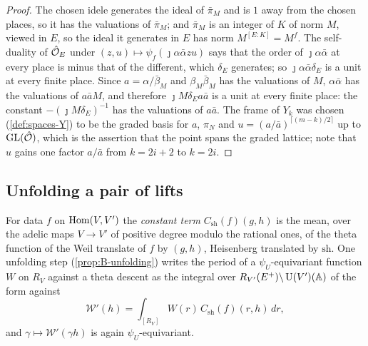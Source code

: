\begin{proof}
The chosen idele generates the ideal of $\bar\pi_M$ and is $1$ away from the chosen places, so it has the valuations of $\bar\pi_M$; and $\bar\pi_M$ is an integer of $K$ of norm $M$, viewed in $E$, so the ideal it generates in $E$ has norm $M^{[E:K]}=M^f$. The self-duality of $\hat{\mathcal{O}}_E$ under $(z,u)\mapsto\psi_f(\jmath\alpha\bar\alpha zu)$ says that the order of $\jmath\alpha\bar\alpha$ at
every place is minus that of the different, which $\delta_E$ generates; so $\jmath\alpha\bar\alpha\delta_E$ is a unit at every finite place. Since $a=\alpha/\bar\beta_M$ and $\beta_M\bar\beta_M$ has the valuations of $M$, $\alpha\bar\alpha$ has the valuations of $a\bar aM$, and therefore $\jmath M\delta_Ea\bar a$ is a unit at every finite place: the constant $-(\jmath M\delta_E)^{-1}$
has the valuations of $a\bar a$. The frame of $Y_k$ was chosen (\cref{def:spaces-Y}) to be the graded basis for $a$, $\pi_N$ and $u=(a/\bar a)^{\lceil(m-k)/2\rceil}$ up to $\operatorname{GL}(\hat{\mathcal{O}})$, which is the assertion that the point spans the graded lattice; note that $u$ gains one factor $a/\bar a$ from $k=2i+2$ to $k=2i$.
\end{proof}

\subsection{Unfolding a pair of lifts}\label{ss:unfold-pair}
For data $f$ on $\operatorname{Hom}(V,V')$ the \emph{constant term} $C_{\mathrm{sh}}(f)(g,h)$ is the mean, over the adelic maps
$V\to V'$ of positive degree modulo the rational ones, of the theta function of the Weil translate of $f$ by $(g,h)$,
Heisenberg translated by $\mathrm{sh}$. One unfolding step (\cref{prop:B-unfolding}) writes the period of a
$\psi_U$-equivariant function $W$ on $R_V$ against a theta descent as the integral over $R_{V'}(E^+)\backslash\operatorname{U}(V')(\mathbb{A})$ of
the form against
\[
  \mathcal W'(h)=\int_{[R_V]}W(r)\,C_{\mathrm{sh}}(f)(r,h)\,dr ,
\]
and $\gamma\mapsto\mathcal W'(\gamma h)$ is again $\psi_U$-equivariant.

